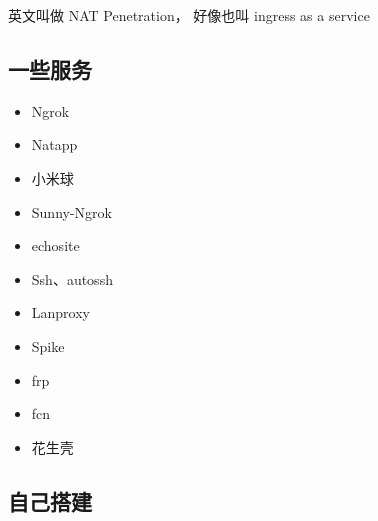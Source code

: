 
\begin{issues}
\issueDraft
\end{issues}

英文叫做 NAT Penetration， 好像也叫 ingress as a service

\subsection{一些服务}
\begin{itemize}
\item Ngrok
\item Natapp
\item 小米球
\item Sunny-Ngrok
\item echosite
\item Ssh、autossh
\item Lanproxy
\item Spike
\item frp
\item fcn
\item 花生壳
\end{itemize}

\subsection{自己搭建}